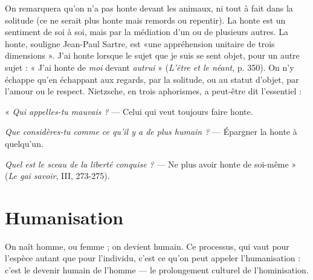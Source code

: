 On remarquera qu’on n’a pas honte devant les animaux, ni tout à fait dans
la solitude (ce ne serait plus honte mais remords ou repentir). La honte est un
sentiment de soi à soi, mais par la médiation d’un ou de plusieurs autres. La
honte, souligne Jean-Paul Sartre, est «une appréhension unitaire de trois
dimensions ». J'ai honte lorsque le sujet que je suis se sent objet, pour un autre
sujet : « J'ai honte de {\it moi} devant {\it autrui} » ({\it L'être et le néant}, p. 350). On n’y
échappe qu’en échappant aux regards, par la solitude, ou au statut d’objet, par
l’amour ou le respect. Nietzsche, en trois aphorismes, a peut-être dit l'essentiel :

« {\it Qui appelles-tu mauvais ?} — Celui qui veut toujours faire honte.

{\it Que considères-tu comme ce qu'il y a de plus humain ?} — Épargner la honte à
quelqu'un.

{\it Quel est le sceau de la liberté conquise ?} — Ne plus avoir honte de soi-même »
({\it Le gai savoir}, III, 273-275).

\section{Humanisation}
On naît homme, ou femme ; on devient humain. Ce
processus, qui vaut pour l’espèce autant que pour l’individu,
c’est ce qu’on peut appeler l’humanisation : c’est le devenir humain de
l’homme — le prolongement culturel de l’hominisation.

